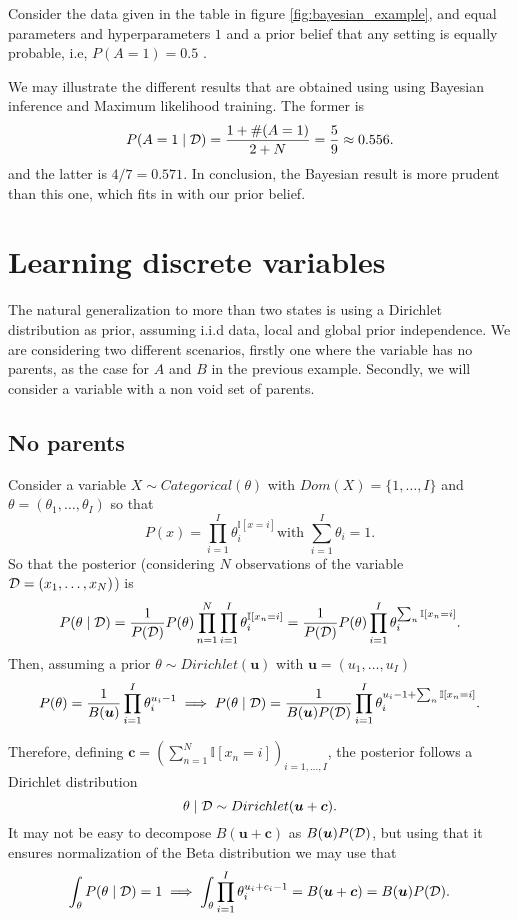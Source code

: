  Consider the data given in the table in figure \ref{fig:bayesian_example}, and
 equal parameters and hyperparameters \(1\) and a prior belief that any setting is equally probable, i.e, \( P(A=1) = 0.5\) . 
 
 We may illustrate the different results that are obtained using using Bayesian inference and Maximum likelihood training. The former is
 \[
   P(A = 1 \mid \mathcal{D}) = \frac{1 + \#(A = 1)}{2 + N} = \frac{5}{9} \approx 0.556.
 \]
 and the latter is \(4/7 = 0.571\). In conclusion, the Bayesian
 result is more prudent than this one, which fits in with our prior belief.

 \section{Learning discrete variables}

 The natural generalization to more than two states is using a Dirichlet
 distribution as prior, assuming i.i.d data, local and global prior
 independence. We are considering two different scenarios, firstly one where the
 variable has no parents, as the case for \(A\) and \(B\) in the previous
 example. Secondly, we will consider a variable with a non void set of parents.

 \subsection{No parents}

 Consider a variable \(X \sim Categorical(\theta)\) with
 \(Dom(X) = \{1, \dots, I\} \) and \(\theta = (\theta_{1},\dots, \theta_{I})\) so that
 \[
   P(x) = \prod_{i = 1}^{I}\theta_{i}^{\mathbb{I}[x = i]} \text{
   with  } \sum_{i=1}^{I}\theta_{i} = 1.
\]
So that the posterior (considering \(N\) observations of the variable
\(\mathcal{D} = (x_{1}, \dots, x_{N})\)) is
\[
  P(\theta \mid \mathcal{D}) = \frac{1}{P(\mathcal{D})} P(\theta) \prod_{n = 1}^{N}\prod_{i =1 }^{I}\theta_{i}^{\mathbb{I}[x_{n} = i]} =  \frac{1}{P(\mathcal{D})} P(\theta) \prod_{i = 1}^{I} \theta_{i}^{\sum_{n} \mathbb{I}[x_{n}=i]}.
\]
Then, assuming a prior \(\theta \sim Dirichlet(\bm{u})\) with \( \bm{u} = (u_{1}, \dots, u_{I})\)
\[
  P(\theta) = \frac{1}{B(\bm{u})}\prod_{i =1}^{I}\theta_{i}^{u_{i}-1} \implies P(\theta \mid \mathcal{D}) = \frac{1}{B(\bm{u})P(\mathcal{D})}\prod_{i=1}^{I}\theta_{i}^{u_{i}-1 + \sum_{n}\mathbb{I}[x_{n} = i]}.
\]

Therefore, defining \(\bm{c} = ( \sum_{n=1}^{N}\mathbb{I}[x_{n} = i])_{i = 1,\dots,I}\), the posterior follows a Dirichlet distribution
\[
  \theta \mid \mathcal{D} \sim Dirichlet(\bm{u} + \bm{c}).
\]
It may not be easy to decompose \(B(\bm{u} + \bm{c})\) as \(B(\bm{u})P(\mathcal{D})\), but using that it ensures normalization of the Beta distribution we may use that
\[
  \int_{\theta} P(\theta \mid \mathcal{D}) = 1 \implies \int_{\theta}\prod_{i=1}^{I}\theta_{i}^{u_{i}+c_{i}-1} = B(\bm{u} + \bm{c}) = B(\bm{u})P(\mathcal{D}).
\]


